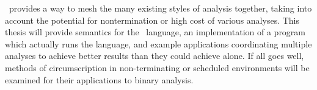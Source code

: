 \sysname\ provides a way to mesh the many existing styles of analysis together, taking into account the potential for nontermination or high cost of various analyses. This thesis will provide semantics for the \sysname\ language, an implementation of a program which actually runs the language, and example applications coordinating multiple analyses to achieve better results than they could achieve alone. If all goes well, methods of circumscription in non-terminating or scheduled environments will be examined for their applications to binary analysis.
